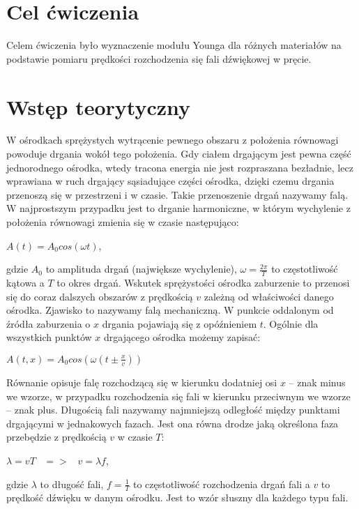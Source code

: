 \documentclass[12pt]{article}
\begin{document}
\section{Cel ćwiczenia}
Celem ćwiczenia było wyznaczenie modułu Younga dla różnych materiałów na podstawie pomiaru prędkości rozchodzenia się fali dźwiękowej w pręcie.
\section{Wstęp teorytyczny}
W ośrodkach sprężystych wytrącenie pewnego obszaru z położenia równowagi powoduje drgania wokół tego położenia. Gdy ciałem drgającym jest pewna część jednorodnego ośrodka, wtedy tracona energia nie jest rozpraszana bezładnie, lecz wprawiana w ruch drgający sąsiadujące części ośrodka, dzięki czemu drgania przenoszą się w przestrzeni i w czasie. Takie przenoszenie drgań nazywamy falą. W najprostszym przypadku jest to drganie harmoniczne, w którym wychylenie \newline z położenia równowagi zmienia się  w czasie następująco:
\begin{center}
\Large $A(t)=A_0cos(\omega{t})$,
\end{center}
gdzie $A_0$ to amplituda drgań (największe wychylenie), $\omega=\frac{2\pi}{T}$ to częstotliwość kątowa a $T$ to okres drgań. \newline
Wskutek sprężystości ośrodka zaburzenie to przenosi się do coraz dalszych obszarów z prędkością $v$ zależną od właściwości danego ośrodka. Zjawisko to nazywamy falą mechaniczną.
W punkcie oddalonym od źródła zaburzenia o $x$ drgania pojawiają się z opóźnieniem $t$. Ogólnie dla wszystkich punktów $x$ drgającego ośrodka możemy zapisać:
\begin{center}
\Large $A(t,x)=A_0cos(\omega(t\pm{\frac{x}{v}}))$
\end{center}
Równanie opisuje falę rozchodzącą się w kierunku dodatniej osi $x$ – znak minus we wzorze, \newline w przypadku rozchodzenia się fali w kierunku przeciwnym we wzorze – znak plus.
Długością fali nazywamy najmniejszą odległość między punktami drgającymi w jednakowych fazach. Jest ona równa drodze jaką określona faza przebędzie z prędkością $v$ w czasie $T$:
\begin{center}
\Large $\lambda=vT\;\;\;=>\;\;\;v=\lambda{f}$,
\end{center}
gdzie $\lambda$ to długość fali, $f=\frac{1}{T}$ to częstotliwość rozchodzenia drgań fali a $v$ to prędkość dźwięku \newline w danym ośrodku. Jest to wzór słuszny dla każdego typu fali. \newline
\end{document}
